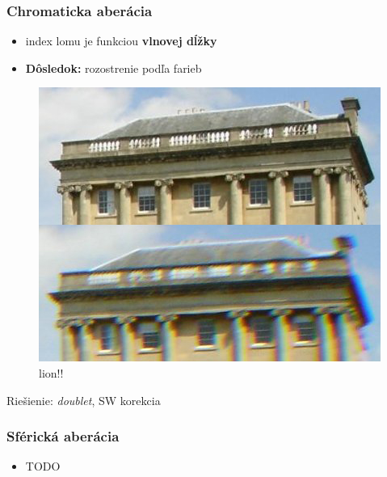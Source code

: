 \documentclass[10pt,xcolor=pdflatex]{beamer}
\begin{document}
\begin{frame}\frametitle{Chromaticka aberácia}
    \begin{itemize}
        \item index lomu je funkciou \textbf{vlnovej dĺžky}
        \item \textbf{Dôsledok:} rozostrenie podľa farieb 
    \end{itemize}

    \begin{figure}
        \includegraphics[scale=3cm]{img/chromaticAberrationWikipedia.jpg}
        \caption{lion!!}
    \end{figure}
    Riešienie: \textit{doublet}, SW korekcia 
\end{frame}

\begin{frame}\frametitle{Sférická aberácia}
    \begin{itemize}
        \item TODO
    \end{itemize}
\end{frame}

\end{document}
